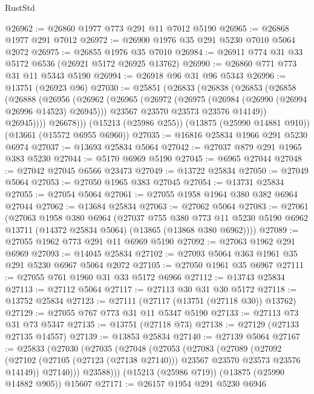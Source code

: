 \begin{lexlean}{RustStd}
\begin{coremodule}
@26962 := @26860 @1977 @773 @291 @11 @7012 @5190
@26965 := @26868 @1977 @291 @7012
@26972 := @26900 @1976 @35 @291 @5230 @7010 @5064 @2072
@26975 := @26855 @1976 @35 @7010
@26984 := @26911 @774 @31 @33 @5172 @6536 (@26921 @5172 @26925 @13762)
@26990 := @26860 @771 @773 @31 @11 @5343 @5190
@26994 := @26918 @96 @31 @96 @5343
@26996 := @13751 (@26923 @96)
@27030 := @25851
    (@26833
      (@26838
        (@26853
          (@26858
            (@26888
              (@26956
                (@26962
                  (@26965
                    (@26972
                      (@26975 (@26984 (@26990 (@26994 @26996 @14523) @26945)))
                      @23567
                      @23570
                      @23573
                      @23576
                      @14149))
                  @26945))))
          @26678)))
    (@15213 (@25986 @255))
    (@13875 (@25990 @14881 @910))
    (@13661 (@15572 @6955 @6960))
@27035 := @16816 @25834 @1966 @291 @5230 @6974
@27037 := @13693 @25834 @5064
@27042 := @27037 @879 @291 @1965 @383 @5230
@27044 := @5170 @6969 @5190
@27045 := @6965 @27044
@27048 := @27042 @27045 @6566 @23473
@27049 := @13722 @25834
@27050 := @27049 @5064
@27053 := @27050 @1965 @383 @27045
@27054 := @13731 @25834
@27055 := @27054 @5064
@27061 := @27055 @1958 @1964 @380 @382 @6964 @27044
@27062 := @13684 @25834
@27063 := @27062 @5064
@27083 := @27061
    (@27063
      @1958
      @380
      @6964
      (@27037
        @755
        @380
        @773
        @11
        @5230
        @5190
        @6962
        @13711
        (@14372 @25834 @5064)
        (@13865 (@13868 @380 @6962))))
@27089 := @27055 @1962 @773 @291 @11 @6969 @5190
@27092 := @27063 @1962 @291 @6969
@27093 := @14045 @25834
@27102 := @27093 @5064 @363 @1961 @35 @291 @5230 @6967 @5064 @2072
@27105 := @27050 @1961 @35 @6967
@27111 := @27055 @761 @1960 @31 @33 @5172 @6966
@27112 := @13743 @25834
@27113 := @27112 @5064
@27117 := @27113 @30 @31 @30 @5172
@27118 := @13752 @25834
@27123 := @27111 (@27117 (@13751 (@27118 @30)) @13762)
@27129 := @27055 @767 @773 @31 @11 @5347 @5190
@27133 := @27113 @73 @31 @73 @5347
@27135 := @13751 (@27118 @73)
@27138 := @27129 (@27133 @27135 @14557)
@27139 := @13853 @25834
@27140 := @27139 @5064
@27167 := @25833
    (@27030
      (@27035
        (@27048
          (@27053
            (@27083
              (@27089
                (@27092
                  (@27102 (@27105 (@27123 (@27138 @27140))) @23567 @23570 @23573 @23576 @14149))
                @27140)))
          @23588)))
    (@15213 (@25986 @719))
    (@13875 (@25990 @14882 @905))
    @15607
@27171 := @26157 @1954 @291 @5230 @6946

\end{coremodule}
\end{lexlean}
